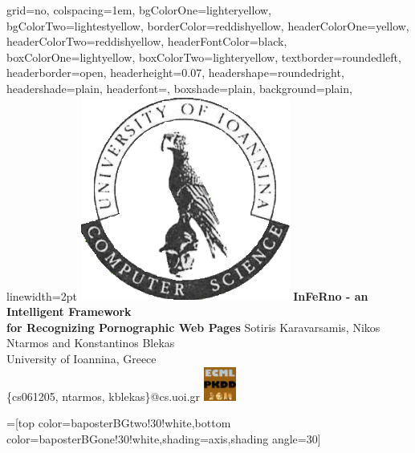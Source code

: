 \documentclass[portrait,a0paper,final,margin=6em]{baposter}
\begin{document}
\begin{poster}{
  grid=no,
  colspacing=1em,
  bgColorOne=lighteryellow,
  bgColorTwo=lightestyellow,
  borderColor=reddishyellow,
  headerColorOne=yellow,
  headerColorTwo=reddishyellow,
  headerFontColor=black,
  boxColorOne=lightyellow,
  boxColorTwo=lighteryellow,
  textborder=roundedleft,
  headerborder=open,
  headerheight=0.07\textheight,
  headershape=roundedright,
  headershade=plain,
  headerfont=\Large\textsf, %
  boxshade=plain,
  background=plain,
  linewidth=2pt
  }
  {
      \includegraphics[width=0.1\linewidth]{UOI-logo}   
  }
  {\sf %
  \bf%
  \LARGE\bf{{InFeRno - an Intelligent Framework \\ for Recognizing Pornographic Web Pages}}}
  {\sf %
  	\vspace{-0.01em}\large{Sotiris Karavarsamis, Nikos Ntarmos and Konstantinos Blekas  \\
     [-0.3em]\normalsize University of Ioannina, Greece}\\
     [-0.3em]\small \{cs061205, ntarmos, kblekas\}@cs.uoi.gr   }
  {
      \includegraphics[width=0.11\linewidth,height=3em]{ecml2011}   
  }

  =[top color=baposterBGtwo!30!white,bottom color=baposterBGone!30!white,shading=axis,shading angle=30]

    \newcommand{\colouredcircle}[1]{%
      \tikz{\useasboundingbox (-0.2em,-0.32em) rectangle(0.2em,0.32em); \draw[draw=black,fill=baposterBGone!80!black!#1!white,line width=0.03em] (0,0) circle(0.18em);}}

\end{poster}
\end{document}
